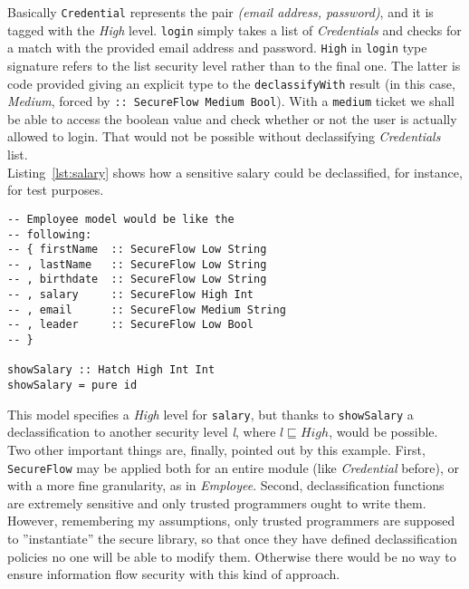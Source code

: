 Basically \texttt{Credential} represents the pair \textit{(email address, password)}, and it is tagged with the \textit{High} level. \texttt{login} simply takes a list of \textit{Credentials} and checks for a match with the provided email address and password. \texttt{High} in \texttt{login} type signature refers to the list security level rather than to the final one. The latter is code provided giving an explicit type to the \texttt{declassifyWith} result (in this case, \textit{Medium}, forced by \texttt{:: SecureFlow Medium Bool}). With a \texttt{medium} ticket we shall be able to access the boolean value and check whether or not the user is actually allowed to login. That would not be possible without declassifying \textit{Credentials} list. \\
Listing~\ref{lst:salary} shows how a sensitive salary could be declassified, for instance, for test purposes.
\begin{lstlisting}[caption={Declassificated salary}, label={lst:salary}]
-- Employee model would be like the 
-- following:
-- { firstName  :: SecureFlow Low String
-- , lastName   :: SecureFlow Low String
-- , birthdate  :: SecureFlow Low String
-- , salary     :: SecureFlow High Int
-- , email      :: SecureFlow Medium String
-- , leader     :: SecureFlow Low Bool
-- }

showSalary :: Hatch High Int Int
showSalary = pure id 
\end{lstlisting}
This model specifies a \textit{High} level for \texttt{salary}, but thanks to \texttt{showSalary} a declassification to another security level \textit{l}, where $l \sqsubseteq High$, would be possible. \\
Two other important things are, finally, pointed out by this example. First, \texttt{SecureFlow} may be applied both for an entire module (like \textit{Credential} before), or with a more fine granularity, as in \textit{Employee}. Second, declassification functions are extremely sensitive and only trusted programmers ought to write them. However, remembering my assumptions, only trusted programmers are supposed to ''instantiate'' the secure library, so that once they have defined declassification policies no one will be able to modify them. Otherwise there would be no way to ensure information flow security with this kind of approach.